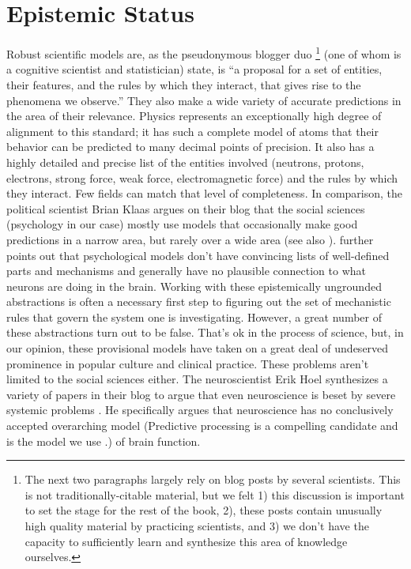 \documentclass[12pt,letterpaper]{book}
\begin{document}
\section{Epistemic Status}
\label{sec:assumptions}
Robust scientific models are, as the pseudonymous blogger duo \footnote{The next two paragraphs largely rely on blog posts by several scientists. This is not traditionally-citable material, but we felt 1) this discussion is important to set the stage for the rest of the book, 2), these posts contain unusually high quality material by practicing scientists, and 3) we don't have the capacity to sufficiently learn and synthesize this area of knowledge ourselves.} \textcite{mechanisticModels} (one of whom is a cognitive scientist and statistician) state, is “a proposal for a set of entities, their features, and the rules by which they interact, that gives rise to the phenomena we observe.” They also make a wide variety of accurate predictions in the area of their relevance. Physics represents an exceptionally high degree of alignment to this standard; it has such a complete model of atoms that their behavior can be predicted to many decimal points of precision. It also has a highly detailed and precise list of the entities involved (neutrons, protons, electrons, strong force, weak force, electromagnetic force) and the rules by which they interact. Few fields can match that level of completeness. In comparison, the political scientist Brian Klaas argues on their blog that the social sciences (psychology in our case) mostly use models that occasionally make good predictions in a narrow area, but rarely over a wide area \cite{zombieSocialScience} (see also \textcite{evidenceBasedPolicy}). \textcite{mechanisticModels} further points out that psychological models don't have convincing lists of well-defined parts and mechanisms and generally have no plausible connection to what neurons are doing in the brain. Working with these epistemically ungrounded abstractions is often a necessary first step to figuring out the set of mechanistic rules that govern the system one is investigating. However, a great number of these abstractions turn out to be false. That’s ok in the process of science, but, in our opinion, these provisional models have taken on a great deal of undeserved prominence in popular culture and clinical practice. These problems aren't limited to the social sciences either. The neuroscientist Erik Hoel synthesizes a variety of papers in their blog to argue that even neuroscience is beset by severe systemic problems \cite{hoelNeuroscience}. He specifically argues that neuroscience has no conclusively accepted overarching model (Predictive processing is a compelling candidate and is the model we use \cite{clark2015surfing}.) of brain function.
\end{document}
